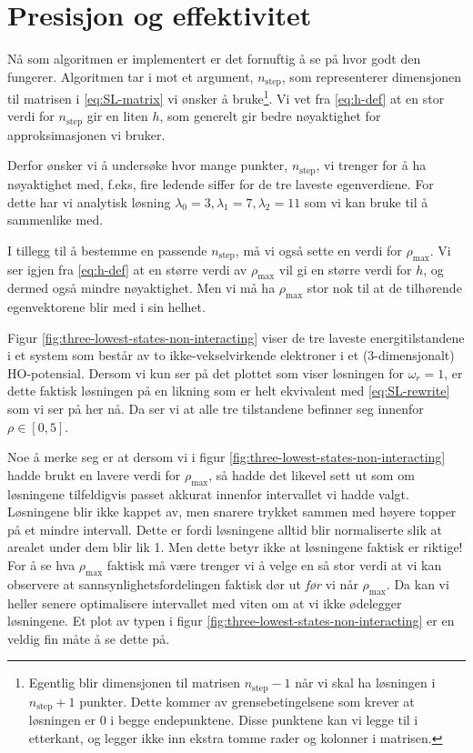 \documentclass[11pt]{article}
\begin{document}
\section{Presisjon og effektivitet}
Nå som algoritmen er implementert er det fornuftig å se på hvor godt
den fungerer. Algoritmen tar i mot et argument, $n_{\text{step}}$, som
representerer dimensjonen til matrisen i \eqref{eq:SL-matrix} vi
ønsker å bruke\footnote{Egentlig blir dimensjonen til matrisen
  $n_\text{step}-1$ når vi skal ha løsningen i $n_\text{step}+1$
  punkter. Dette kommer av grensebetingelsene som krever at løsningen
  er 0 i begge endepunktene. Disse punktene kan vi legge til i
  etterkant, og legger ikke inn ekstra tomme rader og kolonner i
  matrisen.}. Vi vet fra \eqref{eq:h-def} at en stor verdi for
$n_\text{step}$ gir en liten $h$, som generelt gir bedre nøyaktighet
for approksimasjonen vi bruker.  

Derfor ønsker vi å undersøke hvor mange punkter, $n_\text{step}$, vi
trenger for å ha nøyaktighet med, f.eks, fire ledende siffer for de
tre laveste egenverdiene. For dette har vi analytisk løsning $\lambda_0=3,\lambda_1=7,\lambda_2=11$ som vi kan bruke til å
sammenlike med. 

I tillegg til å bestemme en passende
$n_\text{step}$, må vi også sette en verdi for $\rho_\text{max}$. Vi
ser igjen fra \eqref{eq:h-def} at en større verdi av $\rho_\text{max}$
vil gi en større verdi for $h$, og dermed også mindre nøyaktighet. Men
vi må ha $\rho_\text{max}$ stor nok til at de tilhørende egenvektorene
blir med i sin helhet. 


Figur \ref{fig:three-lowest-states-non-interacting} viser de tre
laveste energitilstandene i et system som består av to
ikke-vekselvirkende elektroner i et (3-dimensjonalt)
HO-potensial. Dersom vi kun ser på det plottet som viser løsningen for
$\omega_r=1$, er dette faktisk løsningen på en likning som er helt
ekvivalent med \eqref{eq:SL-rewrite} som vi ser på her nå. Da ser vi
at alle tre tilstandene befinner seg innenfor $\rho\in[0,5]$. 

Noe å merke seg er at dersom vi i figur \ref{fig:three-lowest-states-non-interacting} hadde brukt en lavere
verdi for $\rho_\text{max}$, så hadde det likevel sett ut som om
løsningene tilfeldigvis passet akkurat innenfor intervallet vi hadde
valgt. Løsningene blir ikke kappet av, men snarere trykket sammen med
høyere topper på et mindre intervall. Dette er fordi løsningene alltid
blir normaliserte slik at arealet under dem blir lik 1. Men dette
betyr ikke at løsningene faktisk er riktige! For å se hva
$\rho_\text{max}$ faktisk må være trenger vi å velge en så stor verdi
at vi kan observere at sannsynlighetsfordelingen faktisk dør ut
\emph{før} vi når $\rho_\text{max}$. Da kan vi heller senere
optimalisere intervallet med viten om at vi ikke ødelegger
løsningene. Et plot av typen i figur
\ref{fig:three-lowest-states-non-interacting} er en veldig fin måte å
se dette på. 
\end{document}
